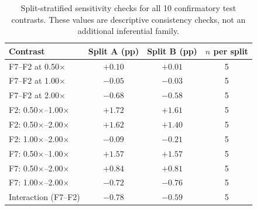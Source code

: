 \begin{table}[!t]
\caption{Split-stratified sensitivity checks for all 10 confirmatory test contrasts. These values are descriptive consistency checks, not an additional inferential family.}
\label{tab:split-sensitivity}
\centering
\footnotesize
\setlength{\tabcolsep}{3pt}
\begin{tabular*}{\columnwidth}{@{\extracolsep{\fill}}lccc@{}}
\toprule
Contrast & Split A (pp) & Split B (pp) & $n$ per split \\
\midrule
F7--F2 at 0.50$\times$ & $+0.10$ & $+0.01$ & 5 \\
F7--F2 at 1.00$\times$ & $-0.05$ & $-0.03$ & 5 \\
F7--F2 at 2.00$\times$ & $-0.68$ & $-0.58$ & 5 \\
F2: 0.50$\times$--1.00$\times$ & $+1.72$ & $+1.61$ & 5 \\
F2: 0.50$\times$--2.00$\times$ & $+1.62$ & $+1.40$ & 5 \\
F2: 1.00$\times$--2.00$\times$ & $-0.09$ & $-0.21$ & 5 \\
F7: 0.50$\times$--1.00$\times$ & $+1.57$ & $+1.57$ & 5 \\
F7: 0.50$\times$--2.00$\times$ & $+0.84$ & $+0.81$ & 5 \\
F7: 1.00$\times$--2.00$\times$ & $-0.72$ & $-0.76$ & 5 \\
Interaction (F7--F2) & $-0.78$ & $-0.59$ & 5 \\
\bottomrule
\end{tabular*}
\end{table}
